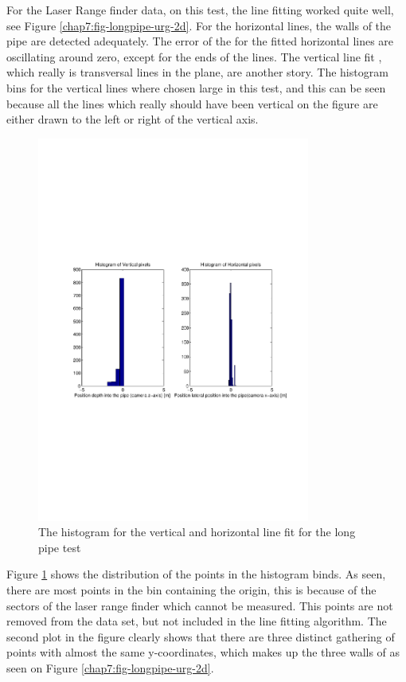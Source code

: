 For the Laser Range finder data, on this test, the line fitting worked quite well, see
Figure \ref{chap7:fig-longpipe-urg-2d}. For the horizontal lines, the walls of the pipe
are detected adequately. The error of the for the fitted horizontal lines are oscillating
around zero, except for the ends of the lines. The vertical line fit , which
really is transversal lines in the plane, are another story. The histogram bins for the
vertical lines where chosen large in this test, and this can be seen because all the lines
which really should have been vertical on the figure are either drawn to the left or right
of the vertical axis. 

\begin{figure}[htbp]
    \centering
    \includegraphics[width=0.8\textwidth]{pics/longpipe-urg-hist}
    \caption{The histogram for the vertical and horizontal line fit for the long pipe test}
    \label{chap8:fig-longpipe-urg-hist}
\end{figure}
Figure \ref{chap8:fig-longpipe-urg-hist} shows the distribution of the points in the
histogram binds. As seen, there are most points in the bin containing the origin, this is
because of the sectors of the laser range finder which cannot be measured. This points are
not removed from the data set, but not included in the line fitting algorithm. 
The second plot in the figure clearly shows that there are three distinct gathering of
points with almost the same y-coordinates, which makes up the three walls of as seen on
Figure \ref{chap7:fig-longpipe-urg-2d}.

